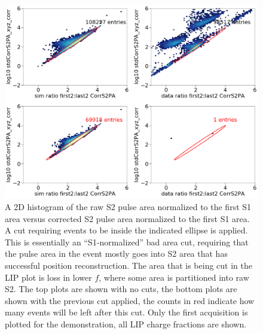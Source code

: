 \begin{figure}[htbp]
\begin{center}
\includegraphics[width=\textwidth]{figures/lips/cut6.png}
\caption{ A 2D histogram of the raw S2 pulse area normalized to the first S1 area versus corrected S2 pulse area normalized to the first S1 area. A cut requiring events to be inside the indicated ellipse is applied. This is essentially an ``S1-normalized'' bad area cut, requiring that the pulse area in the event mostly goes into S2 area that has successful position reconstruction. The area that is being cut in the \acs{LIP} plot is loss in lower $f$, where some area is partitioned into raw S2. The top plots are shown with no cuts, the bottom plots are shown with the previous cut applied, the counts in red indicate how many events will be left after this cut. Only the first acquisition is plotted for the demonstration, all \acs{LIP} charge fractions are shown. }
\label{fig:cut6}
\end{center}
\end{figure}


